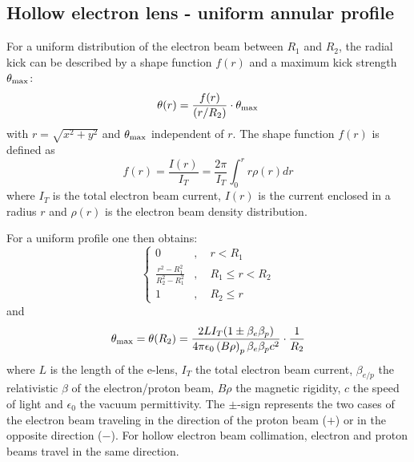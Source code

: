 \subsection{Hollow electron lens - uniform annular profile}
For a uniform distribution of the electron beam between $R_1$ and $R_2$, the radial kick can be described by a shape function $f(r)$ and a maximum kick strength $\theta_{\rm max}$:
\begin{equation}
\theta(r)=\frac{f(r)}{(r/R_2)}\cdot \theta_{\rm max}
\end{equation}
with $r=\sqrt{x^2+y^2}$ and $\theta_{\rm max}$ independent of $r$. The shape function $f(r)$ is defined as
\begin{equation}
f(r) = \frac{I(r)}{I_T}=\frac{2\pi}{I_T}\int_{0}^r r\rho(r) dr
\end{equation}
where $I_T$ is the total electron beam current, $I(r)$ is the current enclosed in a radius $r$ and $\rho(r)$ is the electron beam density distribution.

For a uniform profile one then obtains:
\begin{equation}
\begin{cases} 0 &,\quad r< R_1\\
\frac{r^2-R_1^2}{R_2^2-R_1^2} &,\quad R_1 \leq r < R_2\\
1 &,\quad R_2 \leq r
\end{cases}
\end{equation}
and
\begin{equation}
\theta_{\rm max} = \theta(R_2) = \frac{2LI_T(1\pm\beta_e\beta_p)}{4\pi\epsilon_0  \left(B\rho\right)_p\beta_e\beta_p c^2}\cdot\frac{1}{R_2}
\end{equation}
where $L$ is the length of the e-lens, $I_T$ the total electron beam current, $\beta_{e/p}$ the relativistic $\beta$ of the electron/proton beam, $B\rho$ the magnetic rigidity, $c$ the speed of light and $\epsilon_0$ the vacuum permittivity. The $\pm$-sign represents the two cases of the electron beam traveling in the direction of the proton beam ($+$) or in the opposite direction ($-$). For hollow electron beam collimation, electron and proton beams travel in the same direction.

